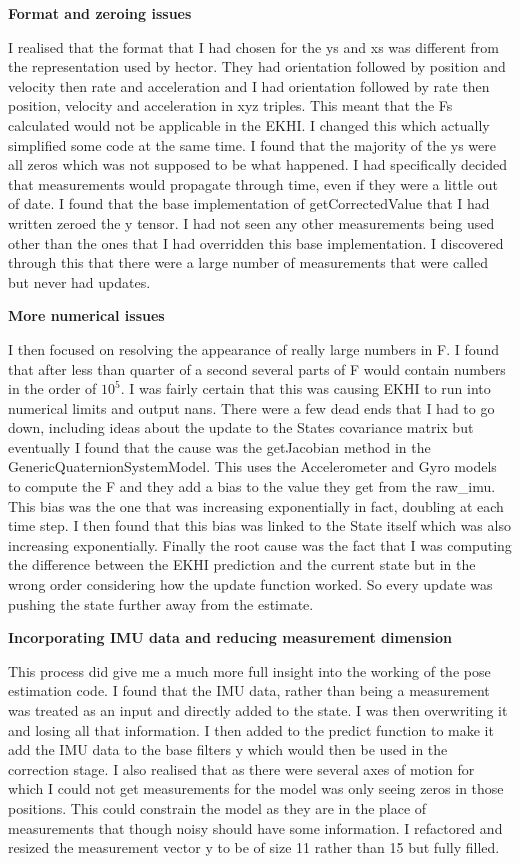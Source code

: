 \documentclass[]{../resources/final_report}
\begin{document}
\textbf{Format and zeroing issues}

I realised that the format that I had chosen for the ys and xs was different from the representation used by hector. They had orientation followed by position and velocity then rate and acceleration and I had orientation followed by rate then position, velocity and acceleration in xyz triples. This meant that the Fs calculated would not be applicable in the EKHI. I changed this which actually simplified some code at the same time. I found that the majority of the ys were all zeros which was not supposed to be what happened. I had specifically decided that measurements would propagate through time, even if they were a little out of date. I found that the base implementation of getCorrectedValue that I had written zeroed the y tensor. I had not seen any other measurements being used other than the ones that I had overridden this base implementation. I discovered through this that there were a large number of measurements that were called but never had updates.

\textbf{More numerical issues}

I then focused on resolving the appearance of really large numbers in F. I found that after less than quarter of a second several parts of F would contain numbers in the order of $10^5$. I was fairly certain that this was causing EKHI to run into numerical limits and output nans. There were a few dead ends that I had to go down, including ideas about the update to the States covariance matrix but eventually I found that the cause was the getJacobian method in the GenericQuaternionSystemModel. This uses the Accelerometer and Gyro models to compute the F and they add a bias to the value they get from the raw\_imu. This bias was the one that was increasing exponentially in fact, doubling at each time step. I then found that this bias was linked to the State itself which was also increasing exponentially. Finally the root cause was the fact that I was computing the difference between the EKHI prediction and the current state but in the wrong order considering how the update function worked. So every update was pushing the state further away from the estimate. 
 
\textbf{Incorporating IMU data and reducing measurement dimension}

This process did give me a much more full insight into the working of the pose estimation code. I found that the IMU data, rather than being a measurement was treated as an input and directly added to the state. I was then overwriting it and losing all that information. I then added to the predict function to make it add the IMU data to the base filters y which would then be used in the correction stage. I also realised that as there were several axes of motion for which I could not get measurements for the model was only seeing zeros in those positions. This could constrain the model as they are in the place of measurements that though noisy should have some information. I refactored and resized the measurement vector y to be of size 11 rather than 15 but fully filled.
\end{document}
